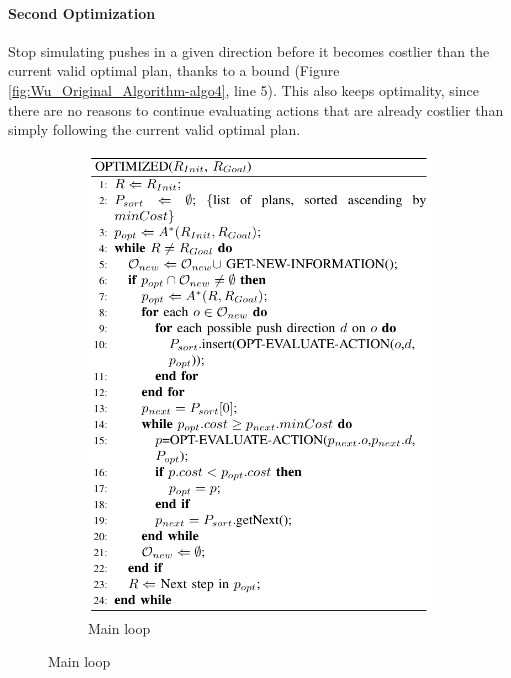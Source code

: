 \paragraph{Second Optimization}\label{optimization_2} Stop simulating pushes in a given direction before it becomes costlier than the current valid optimal plan, thanks to a bound (Figure \ref{fig:Wu_Original_Algorithm-algo4}, line 5). This also keeps optimality, since there are no reasons to continue evaluating actions that are already costlier than simply following the current valid optimal plan.

\begin{figure}[H]
\centering
\begin{subfigure}{.45\textwidth}
  \centering
  \includegraphics[width=\linewidth]{Figures/Wu_Original_Algorithm/algo3.png}
  \caption{Main loop}
  \label{fig:Wu_Original_Algorithm-algo3}
\end{subfigure}\hspace*{\fill}

\end{figure}
